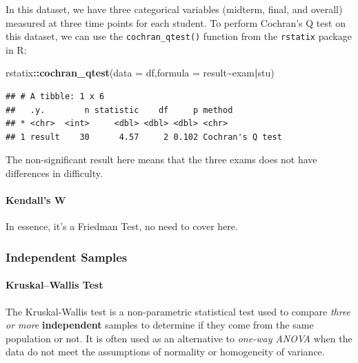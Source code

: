 \documentclass[
]{ctexart}
\newenvironment{Shaded}{\begin{snugshade}}{\end{snugshade}}
\newcommand{\AttributeTok}[1]{\textcolor[rgb]{0.13,0.29,0.53}{#1}}
\newcommand{\FunctionTok}[1]{\textcolor[rgb]{0.13,0.29,0.53}{\textbf{#1}}}
\newcommand{\NormalTok}[1]{#1}
\newcommand{\SpecialCharTok}[1]{\textcolor[rgb]{0.81,0.36,0.00}{\textbf{#1}}}
\begin{document}
In this dataset, we have three categorical variables (midterm, final,
and overall) measured at three time points for each student. To perform
Cochran's Q test on this dataset, we can use the
\texttt{cochran\_qtest()} function from the \texttt{rstatix} package in
R:

\begin{Shaded}
\begin{Highlighting}[]
\NormalTok{rstatix}\SpecialCharTok{::}\FunctionTok{cochran\_qtest}\NormalTok{(}\AttributeTok{data =}\NormalTok{ df,}\AttributeTok{formula =}\NormalTok{ result}\SpecialCharTok{\textasciitilde{}}\NormalTok{exam}\SpecialCharTok{|}\NormalTok{stu)}
\end{Highlighting}
\end{Shaded}

\begin{verbatim}
## # A tibble: 1 x 6
##   .y.        n statistic    df     p method          
## * <chr>  <int>     <dbl> <dbl> <dbl> <chr>           
## 1 result    30      4.57     2 0.102 Cochran's Q test
\end{verbatim}

The non-significant result here means that the three exams does not have
differences in difficulty.

\hypertarget{kendalls-w-1}{%
\paragraph{Kendall's W}\label{kendalls-w-1}}

In essence, it's a Friedman Test, no need to cover here.

\hypertarget{independent-samples-1}{%
\subsubsection{Independent Samples}\label{independent-samples-1}}

\hypertarget{kruskalwallis-test}{%
\paragraph{Kruskal--Wallis Test}\label{kruskalwallis-test}}

The Kruskal-Wallis test is a non-parametric statistical test used to
compare \emph{three or more} \textbf{independent} samples to determine
if they come from the same population or not. It is often used as an
alternative to \emph{one-way ANOVA} when the data do not meet the
assumptions of normality or homogeneity of variance.
\end{document}
